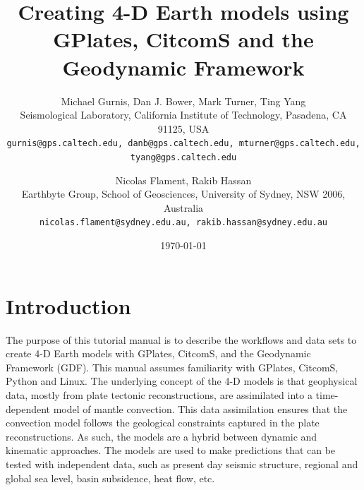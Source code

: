 \documentclass[letterpaper,12pt]{article}
\begin{document}
\title{Creating 4-D Earth models using GPlates, CitcomS and the Geodynamic Framework}
\author{Michael Gurnis, Dan J. Bower, Mark Turner, Ting Yang\\
\small Seismological Laboratory, California Institute of Technology, Pasadena, CA 91125, USA\\
\small \texttt{gurnis@gps.caltech.edu, danb@gps.caltech.edu, mturner@gps.caltech.edu, tyang@gps.caltech.edu}
\and
Nicolas Flament, Rakib Hassan\\
\small Earthbyte Group, School of Geosciences, University of Sydney, NSW 2006, Australia\\
\small \texttt{nicolas.flament@sydney.edu.au, rakib.hassan@sydney.edu.au}
}
\date{\today}

\maketitle

\onehalfspacing

\tableofcontents

\listoffigures

\newpage


\section{Introduction}
The purpose of this tutorial manual is to describe the workflows and data sets to create 4-D Earth models 
with GPlates, CitcomS, and the Geodynamic Framework (GDF).  
This manual assumes familiarity with GPlates, CitcomS, Python and Linux.  
The underlying concept of the 4-D models is that geophysical data, mostly from plate tectonic reconstructions, 
are assimilated into a time-dependent model of mantle convection.  
This data assimilation ensures that the convection model follows the geological constraints captured in the plate reconstructions.  
As such, the models are a hybrid between dynamic and kinematic approaches.  
The models are used to make predictions that can be tested with independent data, such as present day seismic structure, 
regional and global sea level, basin subsidence, heat flow, etc.
\end{document}
